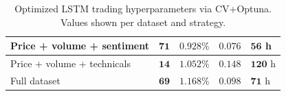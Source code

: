 \begin{table}[htbp]
\begin{minipage}[t]{0.7\textwidth}
\begin{tabular}{|p{3.4cm}|p{1.5cm}|p{1.6cm}|p{1.4cm}|p{1.2cm}|}
			\hline
				Price + volume + sentiment & $\mathbf{71}$ & $\mathbf{0.928\%}$ & $\mathbf{0.076}$ & $\mathbf{56}$ h \\
			\hline
				Price + volume + technicals & $\mathbf{14}$ & $\mathbf{1.052\%}$ & $\mathbf{0.148}$ & $\mathbf{120}$ h \\
			\hline
				Full dataset & $\mathbf{69}$ & $\mathbf{1.168\%}$ & $\mathbf{0.098}$ & $\mathbf{71}$ h \\
			\hline
			\end{tabular}
	\end{minipage}
	\caption{Optimized LSTM trading hyperparameters via CV+Optuna. Values shown per dataset and strategy.}
	\label{tab:lstm_hyperparams_summary}
\end{table}